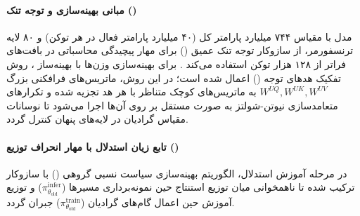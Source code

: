 \item {}

\paragraph*{مبانی بهینه‌سازی و توجه تنک ()}
مدل  با مقیاس ۷۴۴ میلیارد پارامتر کل (۴۰ میلیارد پارامتر فعال در هر توکن) و ۸۰ لایه ترنسفورمر، از سازوکار توجه تنک عمیق () برای مهار پیچیدگی محاسباتی در بافت‌های فراتر از ۱۲۸ هزار توکن استفاده می‌کند \cite{glm2026v5}. برای بهینه‌سازی وزن‌ها با بهینه‌ساز ، روش تفکیک هدهای توجه () اعمال شده است؛ در این روش، ماتریس‌های فرافکنی بزرگ $W^{UQ}, W^{UK}, W^{UV}$ به ماتریس‌های کوچک متناظر با هر هد تجزیه شده و تکرارهای متعامدسازی نیوتن-شولتز به صورت مستقل بر روی آن‌ها اجرا می‌شود تا نوسانات مقیاس گرادیان در لایه‌های پنهان کنترل گردد.

\paragraph*{تابع زیان استدلال با مهار انحراف توزیع ()}
در مرحله آموزش استدلال، الگوریتم بهینه‌سازی سیاست نسبی گروهی () \cite{shao2024deepseekmath} با سازوکار  ترکیب شده تا ناهمخوانی میان توزیع استنتاج حین نمونه‌برداری مسیرها ($\pi_{\theta_{\text{old}}}^{\text{infer}}$) و توزیع آموزش حین اعمال گام‌های گرادیان ($\pi_{\theta_{\text{old}}}^{\text{train}}$) جبران گردد. 

